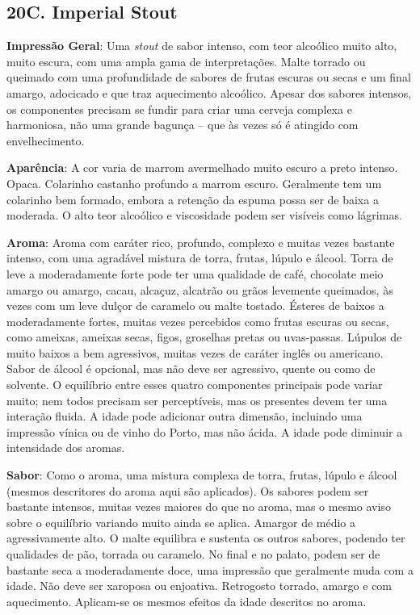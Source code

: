 \subsection*{20C. Imperial Stout}

\textbf{Impressão Geral}: Uma \textit{stout} de sabor intenso, com teor alcoólico muito alto, muito escura, com uma ampla gama de interpretações. Malte torrado ou queimado com uma profundidade de sabores de frutas escuras ou secas e um final amargo, adocicado e que traz aquecimento alcoólico. Apesar dos sabores intensos, os componentes precisam se fundir para criar uma cerveja complexa e harmoniosa, não uma grande bagunça – que às vezes só é atingido com envelhecimento.

\textbf{Aparência}: A cor varia de marrom avermelhado muito escuro a preto intenso. Opaca. Colarinho castanho profundo a marrom escuro. Geralmente tem um colarinho bem formado, embora a retenção da espuma possa ser de baixa a moderada. O alto teor alcoólico e viscosidade podem ser visíveis como lágrimas.

\textbf{Aroma}: Aroma com caráter rico, profundo, complexo e muitas vezes bastante intenso, com uma agradável mistura de torra, frutas, lúpulo e álcool. Torra de leve a moderadamente forte pode ter uma qualidade de café, chocolate meio amargo ou amargo, cacau, alcaçuz, alcatrão ou grãos levemente queimados, às vezes com um leve dulçor de caramelo ou malte tostado. Ésteres de baixos a moderadamente fortes, muitas vezes percebidos como frutas escuras ou secas, como ameixas, ameixas secas, figos, groselhas pretas ou uvas-passas. Lúpulos de muito baixos a bem agressivos, muitas vezes de caráter inglês ou americano. Sabor de álcool é opcional, mas não deve ser agressivo, quente ou como de solvente. O equilíbrio entre esses quatro componentes principais pode variar muito; nem todos precisam ser perceptíveis, mas os presentes devem ter uma interação fluida. A idade pode adicionar outra dimensão, incluindo uma impressão vínica ou de vinho do Porto, mas não ácida. A idade pode diminuir a intensidade dos aromas.

\textbf{Sabor}: Como o aroma, uma mistura complexa de torra, frutas, lúpulo e álcool (mesmos descritores do aroma aqui são aplicados). Os sabores podem ser bastante intensos, muitas vezes maiores do que no aroma, mas o mesmo aviso sobre o equilíbrio variando muito ainda se aplica. Amargor de médio a agressivamente alto. O malte equilibra e sustenta os outros sabores, podendo ter qualidades de pão, torrada ou caramelo. No final e no palato, podem ser de bastante seca a moderadamente doce, uma impressão que geralmente muda com a idade. Não deve ser xaroposa ou enjoativa. Retrogosto torrado, amargo e com aquecimento. Aplicam-se os mesmos efeitos da idade descritos no aroma.

